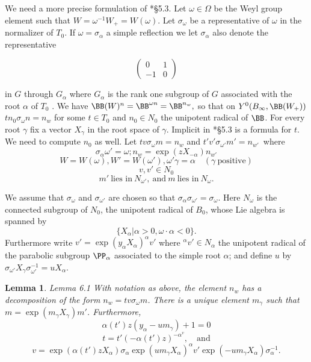 \documentclass{memo-l}
\newtheorem{lemma}[theorem]{Lemma}
\theoremstyle{definition}
\theoremstyle{remark}
\numberwithin{section}{chapter}
\numberwithin{equation}{chapter}
\begin{document}
   We need a more precise formulation of \cite{MR701566}*{\S5.3}.
 Let ${\omega} \in {\Omega}$ be the Weyl group element such that
$W = {\omega}^{-1}W_{+} = W({\omega})$.
 Let ${\sigma}_{{\omega}}$ be a representative of ${\omega}$ in the normalizer
of $T_{0}$.
 If ${\omega} = {\sigma}_{{\alpha}}$ a simple reflection we let
${\sigma}_{{\alpha}}$ also denote the representative

$$
\begin{pmatrix}
0 & 1 \\
-1 & 0
\end{pmatrix}
$$

\noindent
in $G$ through $G_{{\alpha}}$ where $G_{{\alpha}}$ is the rank one subgroup of
$G$ associated with the root ${\alpha}$ of $T_{0}$ \cite{MR0396773}.
 We have ${\BB}(W)^n = {\BB}^{\omega n}  = {\BB}^{n_w},$
so that on $Y^{0}(B_{{\infty}},{\BB}(W_{+}))$
$tn_{0}{\sigma}_\omega n = n_{w}$ for some $t \in T_{0}$ and $n_{0} \in N_{0}$ the
unipotent radical
of ${\BB}$.
 For every root ${\gamma}$ fix a vector $X_{{\gamma}}$ in the root space of
${\gamma}$.
 Implicit in \cite{MR701566}*{\S5.3} is a formula for $t$.
 We need to compute $n_{0}$ as well.
 Let $tv{\sigma}_{{\omega}}m =n_{w}$ and $t'v'{\sigma}_{{\omega}'}m' =n_{w'}$\
where
$$
{\sigma}_{{\alpha}}{\omega}'={\omega}; n_{w} = \exp(zX_{-{\alpha}})n_{w'}
$$
$$
W = W({\omega}), W' = W({\omega}'), {\omega}'{\gamma} = {\alpha}\quad ({\gamma}\
{\text{positive}})
$$
$$
v, v' \in N_{0}
$$
$$
m'\ {\text{lies\ in}}\ N_{{\omega}'},\   {\text{and}}\ m\ {\text{lies\ in}}\
N_{{\omega}}.
$$

\noindent
We assume that ${\sigma}_{{\omega}}$ and ${\sigma}_{{\omega}'}$ are chosen so
that ${\sigma}_{{\alpha}}{\sigma}_{{\omega}'} = {\sigma}_{{\omega}}$.
 Here $N_{{\omega}}$ is the connected subgroup of $N_{0}$, the unipotent
radical of $B_{0}$, whose Lie algebra is spanned by
$$
\{X_{{\alpha}}\vert  {\alpha} > 0, {\omega}\cdot {\alpha} < 0\}.
$$
Furthermore write $v' = \exp(y_{{\alpha}}X_{{\alpha}})^{{\alpha}}v'$ where
$^{{\alpha}}v' \in N_{{\alpha}}$ the unipotent radical of the parabolic subgroup
${\PP}_{{\alpha}}$ associated to the simple root $\alpha$; and define $u$ by
${\sigma}_{{\omega}'}X_{{\gamma}}{\sigma}_{{\omega}'}^{-1} =
uX_{{\alpha}}$.

\medpagebreak

\begin{lemma}{Lemma 6.1}   With notation as above, the element $n_{w}$ has a
decomposition of the form $n_{w} = tv{\sigma}_{{\omega}}m$.
 There is a unique element $m_{{\gamma}}$ such that $m =
\exp(m_{{\gamma}}X_{{\gamma}})m'$.
 Furthermore,
$$
{\alpha}(t')z(y_{{\alpha}}-um_{\gamma}) + 1 = 0
$$
$$
t = t'(-{\alpha}(t')z)^{-{\alpha}^v},\quad  {\text{and}}
$$
$$
v = \exp({\alpha}(t')zX_{{\alpha}}){\sigma}_{{\alpha}}\exp(um_{{\gamma}}
X_{{\alpha}})^{{\alpha}}v'\exp(-um_{{\gamma}}X_{{\alpha}})
{\sigma}_{{\alpha}}^{-1} .
$$
\end{lemma}
\end{document}
